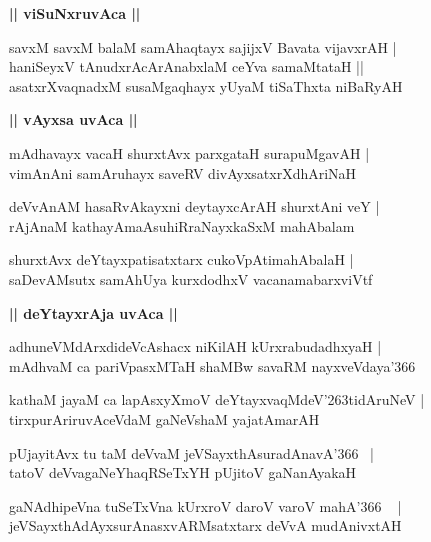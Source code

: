 \documentclass[twoside,12pt,openright]{book}
\def\S{\char'263}
\newcounter{shloka}[chapter]
\def\uvaca#1{\centerline{{\large\textbf{#1}}}}
\begin{document}
\uvaca{|| viSuNxruvAca ||}

\begin{shloka}%
savxM savxM balaM samAhaqtayx sajijxV Bavata vijavxrAH |\\
haniSeyxV tAnudxrAcArAnabxlaM ceYva samaMtataH ||\\
asatxrXvaqnadxM susaMgaqhayx yUyaM tiSaThxta niBaRyAH 
\end{shloka}

\uvaca{|| vAyxsa uvAca ||}

\begin{shloka}%
mAdhavayx vacaH shurxtAvx parxgataH surapuMgavAH |\\
vimAnAni samAruhayx saveRV divAyxsatxrXdhAriNaH 
\end{shloka}

\begin{shloka}%
deVvAnAM hasaRvAkayxni deytayxcArAH shurxtAni veY |\\
rAjAnaM kathayAmaAsuhiRraNayxkaSxM mahAbalam 
\end{shloka}

\begin{shloka}%
shurxtAvx deYtayxpatisatxtarx cukoVpAtimahAbalaH |\\
saDevAMsutx samAhUya kurxdodhxV vacanamabarxviVtf 
\end{shloka}

\uvaca{|| deYtayxrAja uvAca ||}

\begin{shloka}%
adhuneVMdArxdideVcAshacx niKilAH kUrxrabudadhxyaH |\\
mAdhvaM ca pariVpasxMTaH shaMBw savaRM nayxveVdaya\char'366
\end{shloka}

\begin{shloka}%
kathaM jayaM ca lapAsxyXmoV deYtayxvaqMdeV\S tidAruNeV |\\
tirxpurAriruvAceVdaM gaNeVshaM yajatAmarAH 
\end{shloka}

\begin{shloka}%
pUjayitAvx tu taM deVvaM jeVSayxthAsuradAnavA\char'366 ~|\\
tatoV deVvagaNeYhaqRSeTxYH pUjitoV gaNanAyakaH 
\end{shloka}

\begin{shloka}%
gaNAdhipeVna tuSeTxVna kUrxroV daroV varoV mahA\char'366 ~ |\\
jeVSayxthAdAyxsurAnasxvARMsatxtarx deVvA mudAnivxtAH 
\end{shloka}
\end{document}
